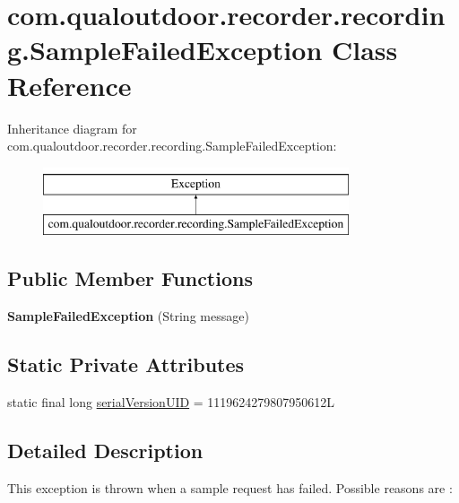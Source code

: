 \hypertarget{classcom_1_1qualoutdoor_1_1recorder_1_1recording_1_1SampleFailedException}{\section{com.\-qualoutdoor.\-recorder.\-recording.\-Sample\-Failed\-Exception Class Reference}
\label{classcom_1_1qualoutdoor_1_1recorder_1_1recording_1_1SampleFailedException}
}
Inheritance diagram for com.\-qualoutdoor.\-recorder.\-recording.\-Sample\-Failed\-Exception\-:\begin{figure}[H]
\begin{center}
\leavevmode
\includegraphics[height=2.000000cm]{classcom_1_1qualoutdoor_1_1recorder_1_1recording_1_1SampleFailedException}
\end{center}
\end{figure}
\subsection*{Public Member Functions}
\begin{DoxyCompactItemize}
\item 
\hypertarget{classcom_1_1qualoutdoor_1_1recorder_1_1recording_1_1SampleFailedException_a4457968a183c7c26c759ea53bc10354c}{{\bfseries Sample\-Failed\-Exception} (String message)}\label{classcom_1_1qualoutdoor_1_1recorder_1_1recording_1_1SampleFailedException_a4457968a183c7c26c759ea53bc10354c}

\end{DoxyCompactItemize}
\subsection*{Static Private Attributes}
\begin{DoxyCompactItemize}
\item 
static final long \hyperlink{classcom_1_1qualoutdoor_1_1recorder_1_1recording_1_1SampleFailedException_aac89010927721f39ee2fe9df4f7617c0}{serial\-Version\-U\-I\-D} = 1119624279807950612\-L
\end{DoxyCompactItemize}


\subsection{Detailed Description}
This exception is thrown when a sample request has failed. Possible reasons are \-:


